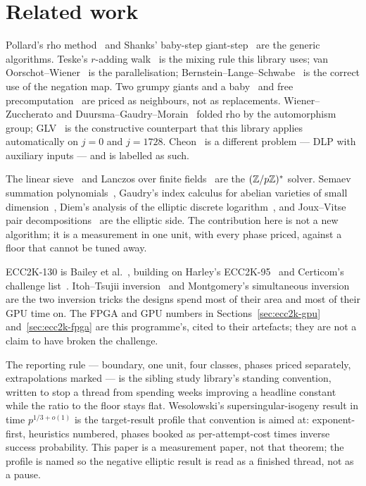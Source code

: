 \section{Related work}
\label{sec:related}

Pollard's rho method~\cite{pollard1978} and Shanks' baby-step
giant-step~\cite{shanks1971} are the generic algorithms. Teske's
$r$-adding walk~\cite{teske2001} is the mixing rule this library uses;
van Oorschot--Wiener~\cite{vanoorschot1999} is the parallelisation;
Bernstein--Lange--Schwabe~\cite{bls2011} is the correct use of the
negation map. Two grumpy giants and a baby~\cite{bernsteinlange2012grumpy}
and free precomputation~\cite{bernsteinlange2012small,bernsteinlange2013}
are priced as neighbours, not as replacements. Wiener--Zuccherato and
Duursma--Gaudry--Morain~\cite{wienerzuccherato1998,duursma1999} folded
rho by the automorphism group; GLV~\cite{glv2001} is the constructive
counterpart that this library applies automatically on $j=0$ and
$j=1728$. Cheon~\cite{cheon2006,cheon2010} is a different problem ---
DLP with auxiliary inputs --- and is labelled as such.

The linear sieve~\cite{cos1986} and Lanczos over finite
fields~\cite{lamacchia1990} are the $(\mathbb{Z}/p\mathbb{Z})^*$ solver. Semaev
summation polynomials~\cite{semaev2004}, Gaudry's index calculus for
abelian varieties of small dimension~\cite{gaudry2009}, Diem's analysis
of the elliptic discrete logarithm~\cite{diem2011}, and Joux--Vitse
pair decompositions~\cite{jouxvitse2013} are the elliptic side. The
contribution here is not a new algorithm; it is a measurement in one
unit, with every phase priced, against a floor that cannot be tuned
away.

ECC2K-130 is Bailey et al.~\cite{bailey2009}, building on Harley's
ECC2K-95~\cite{harley1998} and Certicom's challenge
list~\cite{certicom1997}. Itoh--Tsujii
inversion~\cite{itoh1988} and Montgomery's simultaneous
inversion~\cite{montgomery1987} are the two inversion tricks the
designs spend most of their area and most of their GPU time on. The
FPGA and GPU numbers in Sections~\ref{sec:ecc2k-gpu} and~\ref{sec:ecc2k-fpga}
are this programme's, cited to their artefacts; they are not a claim
to have broken the challenge.

The reporting rule --- boundary, one unit, four classes, phases priced
separately, extrapolations marked --- is the sibling study library's
standing convention, written to stop a thread from spending weeks
improving a headline constant while the ratio to the floor stays
flat. Wesolowski's supersingular-isogeny result in time
$p^{1/3+o(1)}$ is the target-result profile that convention is aimed
at: exponent-first, heuristics numbered, phases booked as
per-attempt-cost times inverse success probability. This paper is a
measurement paper, not that theorem; the profile is named so the
negative elliptic result is read as a finished thread, not as a
pause.
